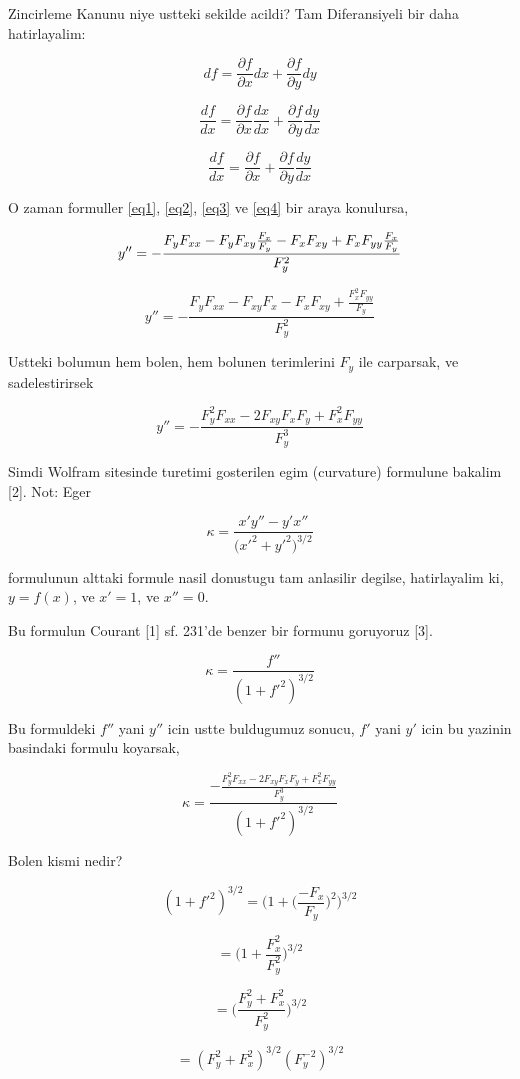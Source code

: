 \documentclass[12pt,fleqn]{article}
\begin{document}
Zincirleme Kanunu niye ustteki sekilde acildi? Tam Diferansiyeli bir daha
hatirlayalim:

\[ df = \frac{\partial f}{\partial x} dx + \frac{\partial f}{\partial y} dy  \]

\[ \frac{df}{dx} = \frac{\partial f}{\partial x} \frac{dx}{dx} + \frac{\partial f}{\partial y} \frac{dy}{dx}  \]

\[ \frac{df}{dx} = \frac{\partial f}{\partial x} + \frac{\partial f}{\partial y} \frac{dy}{dx}  \]

O zaman formuller \ref{eq1}, \ref{eq2}, \ref{eq3} ve \ref{eq4} bir araya konulursa,

\[ y '' = - \frac{F_yF_{xx} - F_y F_{xy}\frac{F_x}{F_y} - F_xF_{xy} + F_xF_{yy}\frac{F_x}{F_y}}{F_y^2}\\ \]

\[ y '' = - \frac{F_yF_{xx} - F_{xy}F_x - F_xF_{xy} + \frac{F_x^2F_{yy}}{F_y}}{F_y^2} \]

Ustteki bolumun hem bolen, hem bolunen terimlerini $F_y$ ile carparsak, ve
sadelestirirsek

\[ y '' = - \frac{F_y^2F_{xx} - 2F_{xy}F_xF_y + F_x^2F_{yy}}{F_y^3} \]

Simdi Wolfram sitesinde turetimi gosterilen egim (curvature) formulune
bakalim [2]. Not: Eger 

\[ \kappa = \frac{x'y''-y'x''}{\bigg(x'^2 + y'^2 \bigg)^{3/2}} \]

formulunun alttaki formule nasil donustugu tam anlasilir degilse, hatirlayalim ki,
$y=f(x)$, ve $x'=1$, ve $x'' = 0$. 

Bu formulun Courant [1] sf. 231'de benzer bir formunu goruyoruz [3]. 

\[ \kappa = \frac{f''}{(1+f'^2)^{3/2}} \]

Bu formuldeki $f''$ yani $y''$ icin ustte buldugumuz sonucu, $f'$ yani $y'$ icin
bu yazinin basindaki formulu koyarsak,

\[ 
\kappa = \frac
{-\frac
{\displaystyle F_y^2F_{xx} - 2F_{xy}F_xF_y +  F_x^2F_{yy}}{\displaystyle F_y^3}}
{(1+f'^2)^{3/2}} 
\]  

Bolen kismi nedir?

\[ (1+f'^2)^{3/2} = \bigg( 1 + \bigg(\frac{-F_x}{F_y}\bigg)^2 \bigg)^{3/2}  \]

\[ = \bigg( 1 + \frac{F_x^2}{F_y^2} \bigg)^{3/2}  \]

\[ = \bigg( \frac{F_y^2 + F_x^2}{F_y^2} \bigg)^{3/2}  \]

\[ = (F_y^2 + F_x^2)^{3/2}(F_y^{-2})^{3/2}  \]
\end{document}
